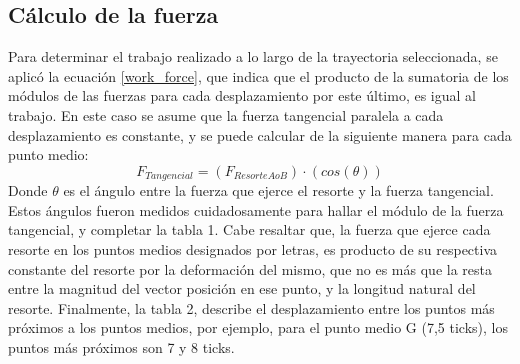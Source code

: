 \documentclass[../main.tex]{subfiles}
\begin{document}
\subsection{Cálculo de la fuerza}
Para determinar el trabajo realizado a lo largo de la 
trayectoria seleccionada, se aplicó la ecuación \ref{work_force}, 
que indica que el producto de la sumatoria de los módulos de las
 fuerzas para cada desplazamiento por este último, es igual 
 al trabajo. En este caso se asume que la fuerza tangencial 
 paralela a cada desplazamiento es constante, y se puede 
 calcular de la siguiente manera para cada punto medio:
\[F_{Tangencial}=(F_{Resorte A o B} )\cdot(cos(\theta ))\]
Donde $\theta$ es el ángulo entre la fuerza que ejerce el resorte y la fuerza tangencial. Estos ángulos fueron medidos cuidadosamente para hallar el módulo de la fuerza tangencial, y completar la tabla 1.
Cabe resaltar que, la fuerza que ejerce cada resorte en los puntos medios designados por letras, es producto de su respectiva constante del resorte por la deformación del mismo, que no es más que la resta entre la magnitud del vector posición en ese punto, y la longitud natural del resorte. Finalmente, la tabla 2, describe el desplazamiento entre los puntos más próximos a los puntos medios, por ejemplo, para el punto medio G (7,5 ticks), los puntos más próximos son 7 y 8 ticks.
\end{document}
